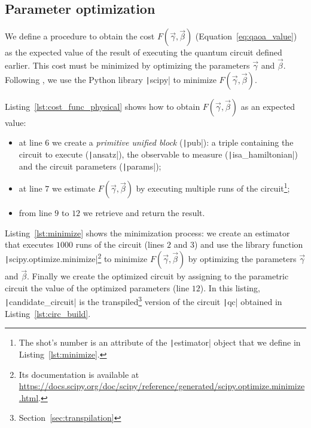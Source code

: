 \subsection{Parameter optimization}
We define a procedure to obtain the cost $F(\vec{\gamma}, \vec{\beta})$ (Equation~\ref{eq:qaoa_value}) as the expected value of the result of executing the quantum circuit defined earlier. This cost must be minimized by optimizing the parameters $\vec{\gamma}$ and $\vec{\beta}$. Following \cite{ibm_qaoa_tutorial}, we use the Python library \texttt|scipy| to minimize $F(\vec{\gamma}, \vec{\beta})$.

\begin{listingenv}[h]
	\caption{$F(\vec{\gamma}, \vec{\beta})$ estimation}
	\label{lst:cost_func_physical}
\end{listingenv}

Listing~\ref{lst:cost_func_physical} shows how to obtain $F(\vec{\gamma}, \vec{\beta})$ as an expected value:
\begin{itemize}
	\item at line $6$ we create a \emph{primitive unified block} (\texttt|pub|): a triple containing the circuit to execute (\texttt|ansatz|), the observable to measure (\texttt|isa_hamiltonian|) and the circuit parameters (\texttt|params|);
	\item at line $7$ we estimate $F(\vec{\gamma}, \vec{\beta})$ by executing multiple runs of the circuit\footnote{The shot's number is an attribute of the \texttt|estimator| object that we define in Listing~\ref{lst:minimize}.};
	\item from line $9$ to $12$ we retrieve and return the result.
\end{itemize}

\begin{listingenv}[h]
	\caption{$\vec{\gamma}$ and $\vec{\beta}$ optimization}
	\label{lst:minimize}
\end{listingenv}

Listing~\ref{lst:minimize} shows the minimization process: we create an estimator that executes $1000$ runs of the circuit (lines $2$ and $3$) and use the library function \texttt|scipy.optimize.minimize|\footnote{Its documentation is available at \url{https://docs.scipy.org/doc/scipy/reference/generated/scipy.optimize.minimize.html}.} to minimize $F(\vec{\gamma}, \vec{\beta})$ by optimizing the parameters $\vec{\gamma}$ and $\vec{\beta}$. Finally we create the optimized circuit by assigning to the parametric circuit the value of the optimized parameters (line $12$). In this listing, \texttt|candidate_circuit| is the transpiled\footnote{Section~\ref{sec:transpilation}} version of the circuit \texttt|qc| obtained in Listing~\ref{lst:circ_build}.

